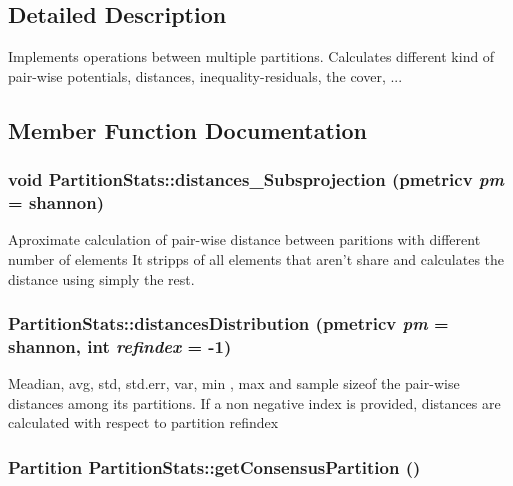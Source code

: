 \subsection{Detailed Description}
Implements operations between multiple partitions. Calculates different kind of pair-wise potentials, distances, inequality-residuals, the cover, ... 



\subsection{Member Function Documentation}
\subsubsection{\setlength{\rightskip}{0pt plus 5cm}void Partition\-Stats::distances\_\-Subsprojection (pmetricv {\em pm} = shannon)}\label{classPartitionStats_a42}


Aproximate calculation of pair-wise distance between paritions with different number of elements It stripps of all elements that aren't share and calculates the distance using simply the rest. 
\subsubsection{ Partition\-Stats::distances\-Distribution (pmetricv {\em pm} = shannon, int {\em refindex} = -1)}\label{classPartitionStats_a41}


Meadian, avg, std, std.err, var, min , max and sample sizeof the pair-wise distances among its partitions. If a non negative index is provided, distances are calculated with respect to partition refindex
\subsubsection{\setlength{\rightskip}{0pt plus 5cm}Partition Partition\-Stats::get\-Consensus\-Partition ()}\label{classPartitionStats_a12}



